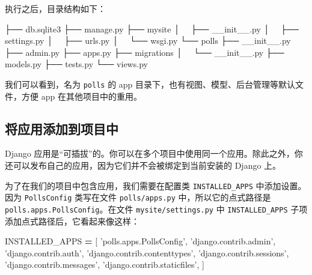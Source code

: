 \documentclass[]{ctexbook}
\newenvironment{Shaded}{\begin{snugshade}}{\end{snugshade}}
\newcommand{\ExtensionTok}[1]{#1}
\newcommand{\NormalTok}[1]{#1}
\newcommand{\OperatorTok}[1]{\textcolor[rgb]{0.81,0.36,0.00}{\textbf{#1}}}
\newcommand{\StringTok}[1]{\textcolor[rgb]{0.31,0.60,0.02}{#1}}
\begin{document}
执行之后，目录结构如下：

\begin{Shaded}
\begin{Highlighting}[]
\NormalTok{├── }\ExtensionTok{db.sqlite3}
\NormalTok{├── }\ExtensionTok{manage.py}
\NormalTok{├── }\ExtensionTok{mysite}
\NormalTok{│   ├── }\ExtensionTok{__init__.py}
\NormalTok{│   ├── }\ExtensionTok{settings.py}
\NormalTok{│   ├── }\ExtensionTok{urls.py}
\NormalTok{│   └── }\ExtensionTok{wsgi.py}
\NormalTok{└── }\ExtensionTok{polls}
\NormalTok{    ├── }\ExtensionTok{__init__.py}
\NormalTok{    ├── }\ExtensionTok{admin.py}
\NormalTok{    ├── }\ExtensionTok{apps.py}
\NormalTok{    ├── }\ExtensionTok{migrations}
\NormalTok{    │   └── }\ExtensionTok{__init__.py}
\NormalTok{    ├── }\ExtensionTok{models.py}
\NormalTok{    ├── }\ExtensionTok{tests.py}
\NormalTok{    └── }\ExtensionTok{views.py}
\end{Highlighting}
\end{Shaded}

我们可以看到，名为 \texttt{polls} 的 app 目录下，也有视图、模型、后台管理等默认文件，方便 app 在其他项目中的重用。

\hypertarget{ux5c06ux5e94ux7528ux6dfbux52a0ux5230ux9879ux76eeux4e2d}{%
\subsection{将应用添加到项目中}\label{ux5c06ux5e94ux7528ux6dfbux52a0ux5230ux9879ux76eeux4e2d}}

Django 应用是``可插拔''的。你可以在多个项目中使用同一个应用。除此之外，你还可以发布自己的应用，因为它们并不会被绑定到当前安装的 Django 上。

为了在我们的项目中包含应用，我们需要在配置类 \texttt{INSTALLED\_APPS} 中添加设置。因为 \texttt{PollsConfig} 类写在文件 \texttt{polls/apps.py} 中，所以它的点式路径是 \texttt{\textquotesingle{}polls.apps.PollsConfig\textquotesingle{}}。在文件 \texttt{mysite/settings.py} 中 \texttt{INSTALLED\_APPS} 子项添加点式路径后，它看起来像这样：

\begin{Shaded}
\begin{Highlighting}[]
\NormalTok{INSTALLED_APPS }\OperatorTok{=}\NormalTok{ [}
    \StringTok{'polls.apps.PollsConfig'}\NormalTok{,}
    \StringTok{'django.contrib.admin'}\NormalTok{,}
    \StringTok{'django.contrib.auth'}\NormalTok{,}
    \StringTok{'django.contrib.contenttypes'}\NormalTok{,}
    \StringTok{'django.contrib.sessions'}\NormalTok{,}
    \StringTok{'django.contrib.messages'}\NormalTok{,}
    \StringTok{'django.contrib.staticfiles'}\NormalTok{,}
\NormalTok{]}
\end{Highlighting}
\end{Shaded}
\end{document}
